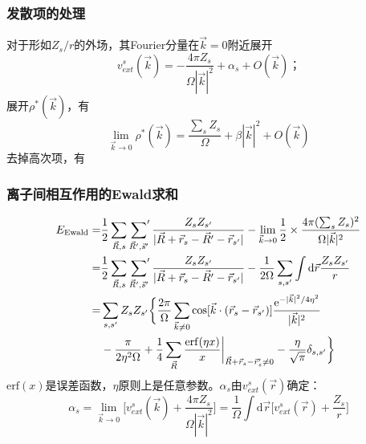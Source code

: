 \documentclass[cjk,slidestop,handout,compress,mathserif,blue]{beamer}	%
\begin{document}
\frame
{
	\frametitle{发散项的处理}
	对于形如$Z_s/r$的外场，其\textrm{Fourier}分量在$\vec k=0$附近展开
	\begin{displaymath}
		v_{ext}^s(\vec k)=-\dfrac{4\pi Z_s}{\Omega|\vec k|^2}+\alpha_s+O(\vec k)； 
	\end{displaymath}
	展开$\rho^{\ast}(\vec k)$，有
	\begin{displaymath}
		\lim_{\vec k\rightarrow 0}\rho^{\ast}(\vec k)=\dfrac{\sum_sZ_s}{\Omega}+\beta|\vec k|^2+O(\vec k)
	\end{displaymath}
去掉高次项，有
\fontsize{8.5pt}{5.2pt}
}

\frame
{
	\frametitle{离子间相互作用的\textrm{Ewald}求和}
	\begin{displaymath}
		\begin{aligned}
			E_{\textrm{Ewald}}=&\dfrac12\sum_{\vec R,s}\sideset{}{^{\prime}}\sum_{\vec R^{\prime},\vec s^{\prime}}\dfrac{Z_sZ_{s^{\prime}}}{|\vec R+\vec r_s-\vec R^{\prime}-\vec r_{s^{\prime}}|}-\lim_{\vec k\rightarrow0}\dfrac12\times\dfrac{4\pi(\sum_sZ_s)^2}{\Omega|\vec k|^2}\\
			=&\dfrac12\sum_{\vec R,s}\sideset{}{^{\prime}}\sum_{\vec R^{\prime},\vec s^{\prime}}\dfrac{Z_sZ_{s^{\prime}}}{|\vec R+\vec r_s-\vec R^{\prime}-\vec r_{s^{\prime}}|}-\dfrac1{2\Omega}\sum_{s,s^{\prime}}\int\mathrm{d}\vec r\dfrac{Z_sZ_{s^{\prime}}}r\\
			=&\sum_{s,s^{\prime}}Z_sZ_{s^{\prime}}\bigg\{\dfrac{2\pi}{\Omega}\sum_{\vec k\neq 0}\cos[\vec k\cdot(\vec r_s-\vec r_{s^{\prime}})]\dfrac{\mathrm{e}^{-|\vec k|^2/4\eta^2}}{|\vec k|^2}\\
			&-\dfrac{\pi}{2\eta^2\Omega}+\dfrac14\sum_{\vec R}\dfrac{\mathrm{erf}(\eta x)}x\bigg|_{\vec R+\vec r_s-\vec r_s^{\prime}\neq0}-\dfrac{\eta}{\sqrt{\pi}}\delta_{s,s^{\prime}}\bigg\}
		\end{aligned}
	\end{displaymath}
	$\mathrm{erf}(x)$是误差函数，$\eta$原则上是任意参数。$\alpha_s$由$v_{ext}^s(\vec r)$确定：
	\begin{displaymath}
		\alpha_s=\lim_{\vec k\rightarrow0}\bigg[v_{ext}^s(\vec k)+\dfrac{4\pi Z_s}{\Omega|\vec k|^2}\bigg]=\dfrac1{\Omega}\int\mathrm{d}\vec r\bigg[v_{ext}^s(\vec r)+\dfrac{Z_s}r\bigg]
	\end{displaymath}
}
\end{document}
